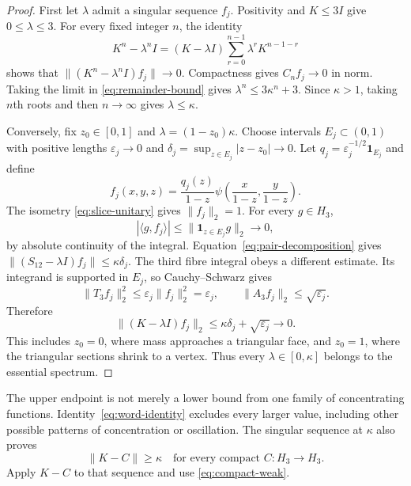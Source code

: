 \documentclass[11pt]{article}
\newcommand{\ip}[2]{\langle #1,#2\rangle}
\newcommand{\norm}[1]{\lVert #1\rVert}
\begin{document}
\begin{proof}
First let $\lambda$ admit a singular sequence $f_j$.
Positivity and $K\leq3I$ give $0\leq\lambda\leq3$.
For every fixed integer $n$, the identity
\[
 K^n-\lambda^n I=(K-\lambda I)
           \sum_{r=0}^{n-1}\lambda^rK^{n-1-r}
\]
shows that $\norm{(K^n-\lambda^n I)f_j}\to0$.
Compactness gives $C_nf_j\to0$ in norm.
Taking the limit in \eqref{eq:remainder-bound} gives
$\lambda^n\leq3\kappa^n+3$.
Since $\kappa>1$, taking $n$th roots and then $n\to\infty$ gives
$\lambda\leq\kappa$.

Conversely, fix $z_0\in[0,1]$ and $\lambda=(1-z_0)\kappa$.
Choose intervals $E_j\subset(0,1)$ with positive lengths $\varepsilon_j\to0$
and $\delta_j=\sup_{z\in E_j}|z-z_0|\to0$.
Let $q_j=\varepsilon_j^{-1/2}\mathbf1_{E_j}$ and define
\begin{equation}\label{eq:singular-sequence}
 f_j(x,y,z)=\frac{q_j(z)}{1-z}
                \psi\left(\frac{x}{1-z},\frac{y}{1-z}\right).
\end{equation}
The isometry \eqref{eq:slice-unitary} gives $\norm{f_j}_2=1$.
For every $g\in H_3$,
\[
 |\ip g{f_j}|\leq\norm{\mathbf1_{z\in E_j}g}_2\longrightarrow0,
\]
by absolute continuity of the integral.
Equation~\eqref{eq:pair-decomposition} gives
$\norm{(S_{12}-\lambda I)f_j}\leq\kappa\delta_j$.
The third fibre integral obeys a different estimate.
Its integrand is supported in $E_j$, so Cauchy--Schwarz gives
\[
 \norm{T_3f_j}_2^2
 \leq\varepsilon_j\norm{f_j}_2^2=\varepsilon_j,
 \qquad\norm{A_3f_j}_2\leq\sqrt{\varepsilon_j}.
\]
Therefore
\begin{equation}\label{eq:singular-error}
              \norm{(K-\lambda I)f_j}_2
                     \leq\kappa\delta_j+\sqrt{\varepsilon_j}\longrightarrow0.
\end{equation}
This includes $z_0=0$, where mass approaches a triangular face,
and $z_0=1$, where the triangular sections shrink to a vertex.
Thus every $\lambda\in[0,\kappa]$ belongs to the essential spectrum.
\end{proof}

The upper endpoint is not merely a lower bound from one family of
concentrating functions.  Identity~\eqref{eq:word-identity} excludes every
larger value, including other possible patterns of concentration or oscillation.
The singular sequence at $\kappa$ also proves
\[
                        \norm{K-C}\geq\kappa
                \quad\text{for every compact }C:H_3\to H_3.
\]
Apply $K-C$ to that sequence and use \eqref{eq:compact-weak}.
\end{document}
